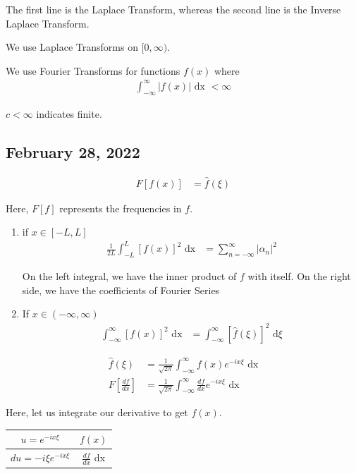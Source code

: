 \documentclass{article}
\begin{document}
The first line is the Laplace Transform, whereas the second line is the Inverse Laplace Transform.

We use Laplace Transforms on $[0, \infty)$.

\note We use Fourier Transforms for functions $f(x)$ where
%
\begin{align}
  \int^\infty_{-\infty} |f(x)| \text{ dx } < \infty
\end{align}

\note $c < \infty$ indicates finite.

\newpage

\subsection*{February 28, 2022}
%
\begin{align}
  F[f(x)] & = \hat f(\xi)
\end{align}

Here, $F[f]$ represents the frequencies in $f$.
\bigbreak
{}
\begin{enumerate}
  \item if $x \in [-L, L]$
  \begin{align}
    \frac{1}{2L} \int^L_{-L} [f(x)]^2 \text{ dx} & = \sum^\infty_{n = -\infty} |\alpha_n|^2
  \end{align}

  On the left integral, we have the inner product of $f$ with itself.
  On the right side, we have the coefficients of Fourier Series
  \item If $x \in (-\infty, \infty)$
  \begin{align}
    \int^\infty_{-\infty} [f(x)]^2 \text{ dx} & = \int^\infty_{-\infty} [\hat f(\xi)]^2 \text{ d}\xi
  \end{align}
\end{enumerate}

%
\begin{align}
  \hat f(\xi) & = \frac{1}{\sqrt{2 \pi}} \int^\infty_{-\infty} f(x) e^{-i x \xi} \text{ dx}\\
  F\left[\frac{df}{dx}\right] & = \frac{1}{\sqrt{2 \pi}} \int^\infty_{-\infty} \frac{df}{dx} e^{- i x \xi} \text{ dx}
\end{align}

Here, let us integrate our derivative to get $f(x)$.
\begin{center}
  \begin{tabular}{c|c}
    $u = e^{-i x \xi}$ & $f(x)$\\
    \hline
    $du = -i \xi e^{-i x \xi}$ & $\frac{df}{dx}$ dx
  \end{tabular}
\end{center}
\end{document}
